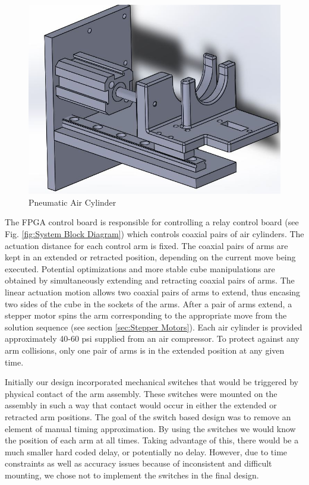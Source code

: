 \documentclass[final, letterpaper, 10 pt, conference, twocolumn]{IEEEtran}
\begin{document}
\begin{figure}[!ht]
\centering
\includegraphics[scale=0.28]{AirCylinder.jpg}
\caption{Pneumatic Air Cylinder}
\label{fig:Pneumatic Air Cylinder}
\end{figure}

The FPGA control board is responsible for controlling a relay control board (see Fig. \ref{fig:System Block Diagram}) which controls coaxial pairs of air cylinders. The actuation distance for each control arm is fixed. The coaxial pairs of arms are kept in an extended or retracted position, depending on the current move being executed. Potential optimizations and more stable cube manipulations  are obtained by simultaneously extending and retracting coaxial pairs of arms. The linear actuation motion allows two coaxial pairs of
arms to extend, thus encasing two sides of the cube in the sockets of the arms. After a pair of arms extend,
a stepper motor spins the arm corresponding to the appropriate move from the solution sequence (see section \ref{sec:Stepper Motors}). Each air cylinder is provided approximately 40-60 psi supplied from an air compressor. To protect against any arm collisions, only one pair of arms is in the extended position at any given time.

Initially our design incorporated mechanical switches that would be triggered by physical contact of the arm assembly.  These switches were mounted on the assembly in such a way that contact would occur in either the extended or retracted arm positions.  The goal of the switch based design was to remove an element of manual timing approximation.  By using the switches we would know the position of each arm at all times.  Taking advantage of this, there would be a much smaller hard coded delay, or potentially no delay.  However, due to time constraints as well as accuracy issues because of inconsistent and difficult mounting, we chose not to implement the switches in the final design.   
 
\end{document}
